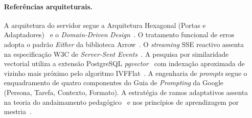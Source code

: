 \paragraph{Referências arquiteturais.}
A arquitetura do servidor segue a Arquitetura Hexagonal (Portas e
Adaptadores)~\cite{cockburn2005hexagonal} e o
\textit{Domain-Driven Design}~\cite{evans2003ddd}.
O tratamento funcional de erros adopta o padrão \textit{Either} da
biblioteca Arrow~\cite{arrow2024}.
O \textit{streaming} SSE reactivo assenta na especificação W3C de
\textit{Server-Sent Events}~\cite{w3c2021sse}.
A pesquisa por similaridade vectorial utiliza a extensão PostgreSQL
\textit{pgvector}~\cite{pgvector2024} com indexação aproximada de
vizinho mais próximo pelo algoritmo IVFFlat~\cite{johnson2019billion}.
A engenharia de \textit{prompts} segue o enquadramento de quatro
componentes do Guia de \textit{Prompting} da Google~\cite{google2024promptguide}
(Persona, Tarefa, Contexto, Formato).
A estratégia de ramos adaptativos assenta na teoria do andaimamento
pedagógico~\cite{vygotsky1978mind} e nos princípios de aprendizagem
por mestria~\cite{bloom1984mastery}.
